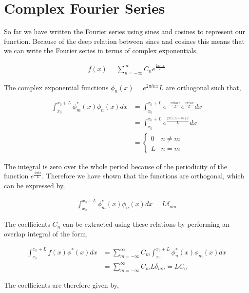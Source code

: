 \documentclass[11pt]{amsart}
\begin{document}
\section{Complex Fourier Series}

So far we have written the Fourier series using sines and cosines to represent our function. Because of the deep relation between sines and cosines this means that we can write the Fourier series in terms of complex exponentials,

\begin{align*}
  f(x) = \sum\limits_{n=-\infty}^{\infty} C_n e^{\frac{2\pi inx}{L}}
\end{align*}

The complex exponential functions $\phi_n(x) = e^{2\pi inx}{L}$ are orthogonal such that,

\begin{align*}
  \int_{x_0}^{x_0+L} \phi_m^*(x)\phi_n(x) dx &= \int_{x_0}^{x_0+L}e^{-\frac{2\pi imx}{L}}e^{\frac{2\pi inx}{L}}dx \\
                                             &= \int_{x_0}^{x_0+L}e^{\frac{2\pi i(n - m)x}{L}} dx\\
                                             &=
  \begin{cases}
    0 & n \neq m \\
    L & n = m
  \end{cases}
\end{align*}

The integral is zero over the whole period because of the periodicity of the function $e^{\frac{2\pi ix}{L}}$. Therefore we have shown that the functions are orthogonal, which can be expressed by,

\begin{align*}
  \int_{x_0}^{x_0+L}\phi_m^*(x)\phi_n(x) dx = L\delta_{mn}
\end{align*}

The coefficients $C_n$ can be extracted using these relations by performing an overlap integral of the form,

\begin{align*}
  \int_{x_0}^{x_0+L}f(x)\phi^*(x)dx &= \sum\limits_{m=-\infty}^{\infty}C_m\int_{x_0}^{x_0+L}\phi_n^*(x)\phi_m(x) dx \\
                                    &= \sum\limits_{m=-\infty}^{\infty}C_m L \delta_{mn} = LC_n
\end{align*}

The coefficients are therefore given by,
\end{document}

